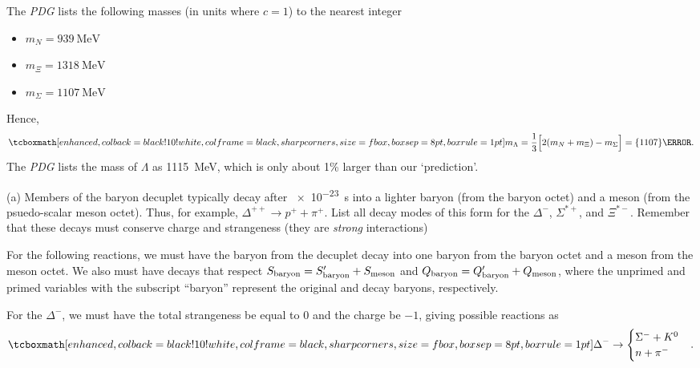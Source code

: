 
The \textit{PDG} lists the following masses (in units where $c = 1$) to the nearest integer
\begin{itemize}
    \item $m_{N} = \qty{939}{\MeV}$
    \item $m_{\Xi} = \qty{1318}{\MeV}$
    \item $m_{\Sigma} = \qty{1107}{\MeV}$
\end{itemize}
Hence,
\begin{eqnarray}
    \label{eq:mass-Lambda}
    \eqbox{
    m_{\Lambda} = \frac{1}{3}\Bigl[ 2(m_{N} + m_{\Xi}) - m_{\Sigma} \Bigr] = \qty{1107}{\MeV} 
}
.\end{eqnarray}
The \textit{PDG} lists the mass of $\Lambda$ as \qty{1115}{\mega\eV}, which is only about 1\% larger than our `prediction'.



(a) Members of the baryon decuplet typically decay after \qty{e-23}{\s} into a lighter baryon (from the baryon octet) and a meson (from the psuedo-scalar meson octet).
Thus, for example, $\Delta^{++} \rightarrow p^{+} + \pi^{+}$.
List all decay modes of this form for the $\Delta^{-}$, $\Sigma^{*+}$, and $\Xi^{*-}$.
Remember that these decays must conserve charge and strangeness (they are \textit{strong} interactions)

For the following reactions, we must have the baryon from the decuplet decay into one baryon from the baryon octet and a meson from the meson octet.
We also must have decays that respect $S_{\rm baryon} = S'_{\rm baryon} + S_{\rm meson}$ and $Q_{\rm baryon} = Q'_{\rm baryon} + Q_{\rm meson}$, where the unprimed and primed variables with the subscript ``baryon'' represent the original and decay baryons, respectively.

For the $\Delta^{-}$, we must have the total strangeness be equal to $0$ and the charge be $-1$, giving possible reactions as
\begin{align}
    \label{eq:decay-modes-delta}
    \eqbox{
    \Delta^{-} \rightarrow 
    \begin{cases}
    \Sigma^{-} + K^{0} \\
    n + \pi^{-}
    \end{cases}
}
.\end{align}

